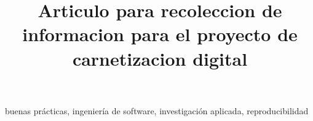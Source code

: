 \documentclass[conference]{IEEEtran}
\begin{document}
\title{Articulo para recoleccion de informacion para el proyecto de carnetizacion digital}

\author{
}


\maketitle

\begin{abstract}

\end{abstract}

\begin{IEEEkeywords}
buenas prácticas, ingeniería de software, investigación aplicada, reproducibilidad
\end{IEEEkeywords}










\printbibliography
\end{document}
